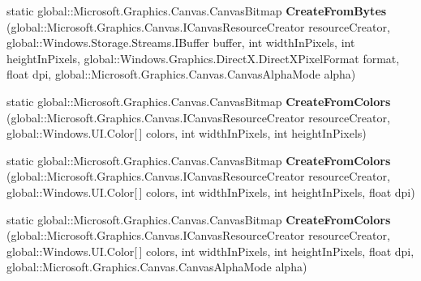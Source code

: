 \begin{DoxyCompactItemize}
\mbox{\label{class_microsoft_1_1_graphics_1_1_canvas_1_1_canvas_bitmap_a86cbc0abd68451ea818e39d8079e60c9}} 
static global\+::\+Microsoft.\+Graphics.\+Canvas.\+Canvas\+Bitmap {\bfseries Create\+From\+Bytes} (global\+::\+Microsoft.\+Graphics.\+Canvas.\+I\+Canvas\+Resource\+Creator resource\+Creator, global\+::\+Windows.\+Storage.\+Streams.\+I\+Buffer buffer, int width\+In\+Pixels, int height\+In\+Pixels, global\+::\+Windows.\+Graphics.\+Direct\+X.\+Direct\+X\+Pixel\+Format format, float dpi, global\+::\+Microsoft.\+Graphics.\+Canvas.\+Canvas\+Alpha\+Mode alpha)
\item 
\mbox{\label{class_microsoft_1_1_graphics_1_1_canvas_1_1_canvas_bitmap_aa56711d36aa2bc46baefdbf6ca694427}} 
static global\+::\+Microsoft.\+Graphics.\+Canvas.\+Canvas\+Bitmap {\bfseries Create\+From\+Colors} (global\+::\+Microsoft.\+Graphics.\+Canvas.\+I\+Canvas\+Resource\+Creator resource\+Creator, global\+::\+Windows.\+U\+I.\+Color\mbox{[}$\,$\mbox{]} colors, int width\+In\+Pixels, int height\+In\+Pixels)
\item 
\mbox{\label{class_microsoft_1_1_graphics_1_1_canvas_1_1_canvas_bitmap_a488d3b7c9e0730ddce84772fc314dedc}} 
static global\+::\+Microsoft.\+Graphics.\+Canvas.\+Canvas\+Bitmap {\bfseries Create\+From\+Colors} (global\+::\+Microsoft.\+Graphics.\+Canvas.\+I\+Canvas\+Resource\+Creator resource\+Creator, global\+::\+Windows.\+U\+I.\+Color\mbox{[}$\,$\mbox{]} colors, int width\+In\+Pixels, int height\+In\+Pixels, float dpi)
\item 
\mbox{\label{class_microsoft_1_1_graphics_1_1_canvas_1_1_canvas_bitmap_a00bad59ca00bf7edd9ce60d8a4aded82}} 
static global\+::\+Microsoft.\+Graphics.\+Canvas.\+Canvas\+Bitmap {\bfseries Create\+From\+Colors} (global\+::\+Microsoft.\+Graphics.\+Canvas.\+I\+Canvas\+Resource\+Creator resource\+Creator, global\+::\+Windows.\+U\+I.\+Color\mbox{[}$\,$\mbox{]} colors, int width\+In\+Pixels, int height\+In\+Pixels, float dpi, global\+::\+Microsoft.\+Graphics.\+Canvas.\+Canvas\+Alpha\+Mode alpha)
\item 
\mbox{\label{class_microsoft_1_1_graphics_1_1_canvas_1_1_canvas_bitmap_afcc3780c1206b46f43b6c56426ce3240}} 

\end{DoxyCompactItemize}
